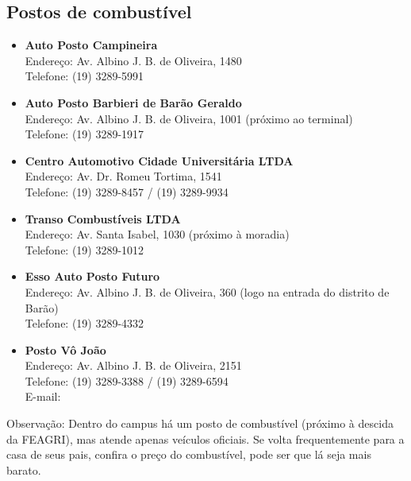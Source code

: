 \subsection{Postos de combustível}

\begin{itemize}
\item \textbf{Auto Posto Campineira}
  \\Endereço: Av. Albino J. B. de Oliveira, 1480
  \\Telefone: (19) 3289-5991

\item \textbf{Auto Posto Barbieri de Barão Geraldo}
  \\Endereço: Av. Albino J. B. de Oliveira, 1001 (próximo ao terminal)
  \\Telefone: (19) 3289-1917

\item \textbf{Centro Automotivo Cidade Universitária LTDA}
  \\Endereço: Av. Dr. Romeu Tortima, 1541
  \\Telefone: (19) 3289-8457 / (19) 3289-9934

\item \textbf{Transo Combustíveis LTDA}
  \\Endereço: Av. Santa Isabel, 1030 (próximo à moradia)
  \\Telefone: (19) 3289-1012

\item \textbf{Esso Auto Posto Futuro}
  \\Endereço: Av. Albino J. B. de Oliveira, 360 (logo na entrada do distrito de
  Barão)
  \\Telefone: (19) 3289-4332

\item \textbf{Posto Vô João}
  \\Endereço: Av. Albino J. B. de Oliveira, 2151
  \\Telefone: (19) 3289-3388 / (19) 3289-6594
  \\E-mail: 
\end{itemize}


Observação: Dentro do campus há um posto de combustível (próximo à descida da
FEAGRI), mas atende apenas veículos oficiais. Se volta frequentemente para a
casa de seus pais, confira o preço do combustível, pode ser que lá seja mais
barato.
